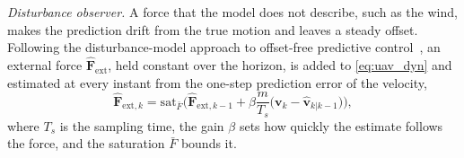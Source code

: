 \textit{Disturbance observer.} A force that the model does not describe, such as the wind, makes the prediction drift from the true motion and leaves a steady offset. Following the disturbance-model approach to offset-free predictive control~\cite{pannocchia2003offsetfree,maeder2009offsetfree}, an external force $\hat{\mathbf{F}}_{\mathrm{ext}}$, held constant over the horizon, is added to \eqref{eq:uav_dyn} and estimated at every instant from the one-step prediction error of the velocity,
\begin{equation}
    \hat{\mathbf{F}}_{\mathrm{ext},k} = \mathrm{sat}_{\bar F}\Big(\hat{\mathbf{F}}_{\mathrm{ext},k-1} + \beta\frac{m}{T_s}\big(\mathbf{v}_k - \hat{\mathbf{v}}_{k|k-1}\big)\Big),
    \label{eq:observer}
\end{equation}
where $T_s$ is the sampling time, the gain $\beta$ sets how quickly the estimate follows the force, and the saturation $\bar F$ bounds it.

